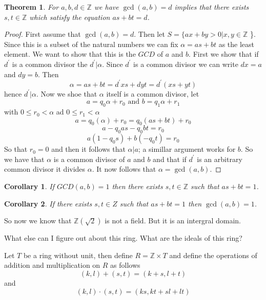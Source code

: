 \documentclass[11pt,largemargins]{homework}
\newcommand{\Z}{\mathbb{Z}}
\newtheorem{theorem}{Theorem}
\newtheorem{corollary}{Corollary}[theorem]
\begin{document}
\begin{theorem}
    For $a, b, d \in \Z$ we have $\gcd(a, b) = d$ implies that there exists $s, t \in \Z$ which satisfy the equation 
    $as + bt = d$. 
\end{theorem}

\begin{proof}
    First assume that $\gcd(a, b) = d$. Then let $S = \{ ax + by > 0 |x, y \in \Z$ \}. Since this is a subset of the 
    natural numbers we can fix $\alpha = as + bt $ as the least element. We want to show that this is the $GCD$ of $a$ and $b$. First 
    we show that if $d^\prime$ is a common divisor the $d^\prime | \alpha$. Since $d^\prime$ is a common divisor we can write 
    $dx = a$ and $dy = b$. Then 
    \[ \alpha = as + bt = d^\prime xs + dyt = d^\prime (xs + yt) \] 
    hence $d^\prime | \alpha$. Now we shoe that $\alpha$ itself is a common divisor, let 
    \[ a = q_0\alpha + r_0 \text{ and } b = q_1 \alpha + r_1\] 
    with $0 \leq r_0 < \alpha$ ad $0 \leq r_1 < \alpha$ 
    \[a = q_0 (\alpha ) + r_0 = q_0(as + bt) + r_0\]
    \[a - q_0as - q_0bt = r_0 \] 
    \[ a(1 - q_0s) + b( - q_0t) = r_0\] 
    So that $r_0 = 0$ and then it follows that $\alpha | a$; a simillar argument works for $b$. So we have that 
    $\alpha$ is a common divisor of $a$ and $b$ and that if $d^\prime $ is an arbitrary common divisor it divides $\alpha$. 
    It now follows that $\alpha = \gcd(a, b)$.

\end{proof}

\begin{corollary}
    If $GCD(a, b) = 1$ then there exists $s, t \in \Z$ such that $as + bt = 1$. 
\end{corollary}

\begin{corollary}
    If there exists $s, t \in Z$ such that $as + bt = 1$ then $\gcd(a, b) = 1$. 
\end{corollary}


So now we know that $\Z(\sqrt{2}) $ is not a field. But it is an intergral domain. 

What else can I figure out about this ring. What are the ideals of this ring? 



Let $T$ be a ring without unit, then define $R = \Z \times T$ and define the operations of addition and multiplication 
on $R$ as follows 
\[ (k, l) + (s, t) = (k + s, l + t) \] 
and 
\[(k, l) \cdot (s, t) = (ks, kt + sl + lt)\]
\end{document}
